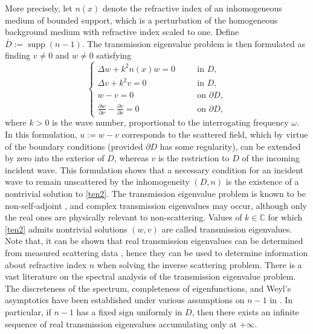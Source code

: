 \documentclass[12pt]{article}
\begin{document}
\noindent
More precisely, let $n(x)$ denote the refractive index of an inhomogeneous medium of bounded support, which is a perturbation of the homogeneous background medium with refractive index scaled to one. Define $\overline{D} := \operatorname{supp}(n-1)$. The transmission eigenvalue problem is then formulated as finding $v \neq 0$ and $w \neq 0$ satisfying
\begin{equation}\label{ten2}
\left\{
\begin{array}{rrcl}
\Delta w + k^2 n(x) w = 0 & \quad & \text{in } D, \\
\Delta v + k^2 v = 0 & \quad & \text{in } D,\\
w-v = 0 & \quad & \text{on } \partial D,\\
\displaystyle \frac{\partial w}{\partial \nu} - \frac{\partial v}{\partial \nu} = 0 & \quad & \text{on } \partial D,
\end{array}
\right.
\end{equation}
where $k > 0$ is the wave number, proportional to the interrogating frequency $\omega$. In this formulation, $u := w-v$ corresponds to the scattered field, which by virtue of the boundary conditions (provided $\partial D$ has some regularity), can be extended by zero into the exterior of $D$, whereas $v$ is the restriction to $D$ of the incoming incident wave. This formulation shows that a necessary condition for an incident wave to remain unscattered by the inhomogeneity $(D,n)$ is the existence of a nontrivial solution to \eqref{ten2}. The transmission eigenvalue problem is known to be non-self-adjoint \cite{CCH-book}, and complex transmission eigenvalues may occur, although only the real ones are physically relevant to non-scattering. Values of $k \in \mathbb{C}$ for which \eqref{ten2} admits nontrivial solutions $(w,v)$ are called transmission eigenvalues. Note that, it can be shown that real transmission eigenvalues can be determined from measured scattering data \cite{CCH-book, eigm1,eigm2}, hence they can be used to determine information about refractive index $n$ when solving the  inverse scattering problem. There is a vast literature on the spectral analysis of the transmission eigenvalue problem. The discreteness of the spectrum, completeness of eigenfunctions, and Weyl’s asymptotics have been established under various assumptions on $n-1$ in \cite{nguyenn, Ki, rob, vodev, vodev2}. In particular, if $n-1$ has a fixed sign uniformly in $D$, then there exists an infinite sequence of real transmission eigenvalues accumulating only at $+\infty$. 
\end{document}

